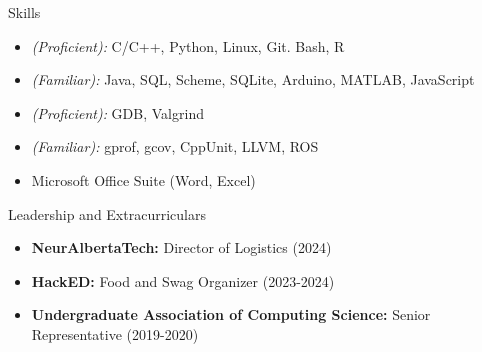 \documentclass[]{mcdowellcv}
\begin{document}
\begin{cvsection}{Skills}
  \begin{cvsubsection}{}{}{}	
    \begin{itemize}
      \item \emph{(Proficient):} C/C++, Python, Linux, Git. Bash, R  
      \item \emph{(Familiar):} Java, SQL, Scheme, SQLite, Arduino, MATLAB, JavaScript
      \item \emph{(Proficient):} GDB, Valgrind
      \item \emph{(Familiar):} gprof, gcov, CppUnit, LLVM, ROS      
      \item Microsoft Office Suite (Word, Excel)
    \end{itemize}
  \end{cvsubsection}
\end{cvsection}

\begin{cvsection}{Leadership and Extracurriculars}{}{}
  \begin{cvsubsection}
    {}{}{}
    \begin{itemize}
      \item \textbf{NeurAlbertaTech:} Director of Logistics (2024)  
      \item \textbf{HackED:} Food and Swag Organizer (2023-2024)  
      \item \textbf{Undergraduate Association of Computing Science:} Senior Representative (2019-2020)  
    \end{itemize}
  \end{cvsubsection}
\end{cvsection}
\end{document}
